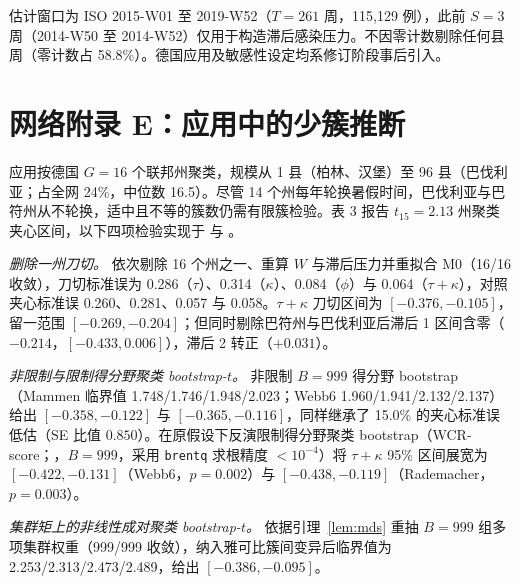 \documentclass[11pt,a4paper]{ctexart}
\theoremstyle{definition}
\begin{document}
估计窗口为 ISO 2015-W01 至 2019-W52（$T=261$ 周，115,129 例），此前 $S=3$ 周（2014-W50 至 2014-W52）仅用于构造滞后感染压力。不因零计数剔除任何县周（零计数占 58.8\%）。德国应用及敏感性设定均系修订阶段事后引入。

\section*{网络附录 E：应用中的少簇推断}

应用按德国 $G=16$ 个联邦州聚类，规模从 1 县（柏林、汉堡）至 96 县（巴伐利亚；占全网 24\%，中位数 16.5）。尽管 14 个州每年轮换暑假时间，巴伐利亚与巴符州从不轮换，适中且不等的簇数仍需有限簇检验\citep{mackinnon2017wild,ferman2019inference,canay2021wild}。表 3 报告 $t_{15}=2.13$ 州聚类夹心区间\citep{imbens2016robust}，以下四项检验实现于  与 。

\emph{删除一州刀切。} 依次剔除 16 个州之一、重算 $W$ 与滞后压力并重拟合 M0（16/16 收敛），刀切标准误为 0.286（$\tau$）、0.314（$\kappa$）、0.084（$\phi$）与 0.064（$\tau+\kappa$），对照夹心标准误 0.260、0.281、0.057 与 0.058。$\tau+\kappa$ 刀切区间为 $[-0.376,-0.105]$，留一范围 $[-0.269,-0.204]$；但同时剔除巴符州与巴伐利亚后滞后 1 区间含零（$-0.214$，$[-0.433,0.006]$），滞后 2 转正（$+0.031$）。

\emph{非限制与限制得分野聚类 bootstrap-$t$。} 非限制 $B=999$ 得分野 bootstrap（Mammen 临界值 1.748/1.746/1.948/2.023；Webb6 1.960/1.941/2.132/2.137）给出 $[-0.358,-0.122]$ 与 $[-0.365,-0.116]$，同样继承了 15.0\% 的夹心标准误低估（SE 比值 $0.850$）。在原假设下反演限制得分野聚类 bootstrap（WCR-score；\citealp{cameron2008bootstrap,kline2012score,webb2023reworking}，$B=999$，采用 \texttt{brentq} 求根精度 $<10^{-4}$）将 $\tau+\kappa$ 95\% 区间展宽为 $[-0.422,-0.131]$（Webb6，$p=0.002$）与 $[-0.438,-0.119]$（Rademacher，$p=0.003$）。

\emph{集群矩上的非线性成对聚类 bootstrap-$t$。} 依据引理~\ref{lem:mds} 重抽 $B=999$ 组多项集群权重（999/999 收敛），纳入雅可比簇间变异后临界值为 2.253/2.313/2.473/2.489，给出 $[-0.386,-0.095]$。
\end{document}
